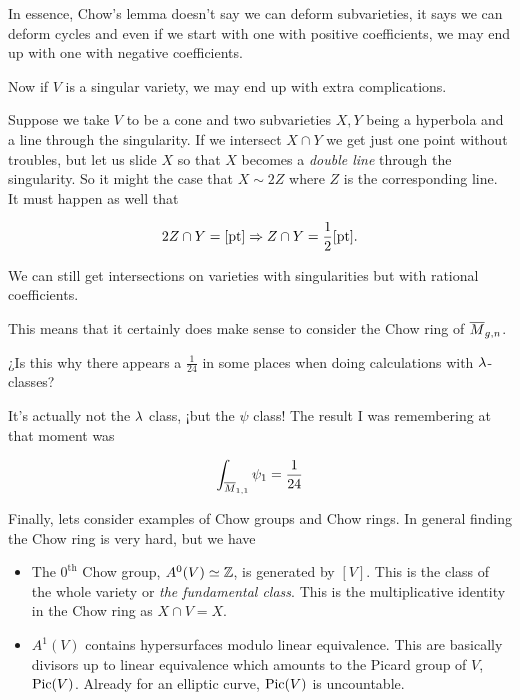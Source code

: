 \documentclass[12pt]{memoir}
\begin{document}
In essence, Chow's lemma doesn't say we can deform subvarieties, it says we can deform cycles and even if we start with one with positive coefficients, we may end up with one with negative coefficients.\par

Now if \(V\) is a singular variety, we may end up with extra complications.

\begin{Ex}
    Suppose we take \(V\) to be a cone and two subvarieties \(X,Y\) being a hyperbola and a line through the singularity.
    If we intersect \(X\cap Y\) we get just one point without troubles, but let us slide \(X\) so that \(X\) becomes a \emph{double line} through the singularity. So it might the case that \(X\sim 2Z\) where \(Z\) is the corresponding line. It must happen as well that

    \[2Z\cap Y=[\text{pt}]\To Z\cap Y =\half[\text{pt}].\]

    We can still get intersections on varieties with singularities but with rational coefficients.
\end{Ex}

This means that it certainly does make sense to consider the Chow ring of \(\overline{M}_{g,n}\).

\begin{Qn}
    ¿Is this why there appears a \(\frac{1}{24}\) in some places when doing calculations with \(\lambda\)-classes?
\end{Qn}

\begin{ptcb}[RQ 241212]
    It's actually not the \(\lambda\) class, ¡but the \(\psi\) class! The result I was remembering at that moment was

    \[\int_{\overline M_{1,1}}\psi_1=\frac{1}{24}\]

\end{ptcb}

Finally, lets consider examples of Chow groups and Chow rings. In general finding the Chow ring is very hard, but we have
\begin{itemize}
    \item The \(0^{\text{th}}\) Chow group, \(A^0(V)\simeq\mathbb{Z}\), is generated by \([V]\). This is the class of the whole variety or \emph{the fundamental class}. This is the multiplicative identity in the Chow ring as \(X\cap V=X\).
    \item \(A^1(V)\) contains hypersurfaces modulo linear equivalence. This are basically divisors up to linear equivalence which amounts to the Picard group of \(V\), \(\operatorname{Pic}(V)\). Already for an elliptic curve, \(\operatorname{Pic}(V)\) is uncountable.
\end{itemize}
\end{document}
